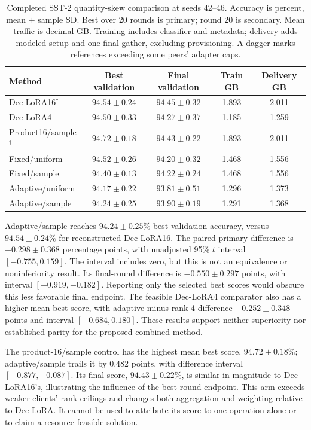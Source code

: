 \documentclass[11pt]{article}
\begin{document}
\begin{table}[t]
\centering
\caption{Completed SST-2 quantity-skew comparison at seeds 42--46. Accuracy is percent, mean $\pm$ sample SD. Best over 20 rounds is primary; round 20 is secondary. Mean traffic is decimal GB. Training includes classifier and metadata; delivery adds modeled setup and one final gather, excluding provisioning. A dagger marks references exceeding some peers' adapter caps.}
\label{tab:quantity-results}
\small
\begin{tabular}{lcccc}
\toprule
Method & Best validation & Final validation & Train GB & Delivery GB\\
\midrule
Dec-LoRA16$^\dagger$ & $94.54\pm0.24$ & $94.45\pm0.32$ & 1.893 & 2.011\\
Dec-LoRA4 & $94.50\pm0.33$ & $94.27\pm0.37$ & 1.185 & 1.259\\
Product16/sample$^\dagger$ & $94.72\pm0.18$ & $94.43\pm0.22$ & 1.893 & 2.011\\
Fixed/uniform & $94.52\pm0.26$ & $94.20\pm0.32$ & 1.468 & 1.556\\
Fixed/sample & $94.40\pm0.13$ & $94.22\pm0.24$ & 1.468 & 1.556\\
Adaptive/uniform & $94.17\pm0.22$ & $93.81\pm0.51$ & 1.296 & 1.373\\
Adaptive/sample & $94.24\pm0.25$ & $93.90\pm0.19$ & 1.291 & 1.368\\
\bottomrule
\end{tabular}
\end{table}

Adaptive/sample reaches $94.24\pm0.25\%$ best validation accuracy, versus $94.54\pm0.24\%$ for reconstructed Dec-LoRA16. The paired primary difference is $-0.298\pm0.368$ percentage points, with unadjusted 95\% $t$ interval $[-0.755,0.159]$. The interval includes zero, but this is not an equivalence or noninferiority result. Its final-round difference is $-0.550\pm0.297$ points, with interval $[-0.919,-0.182]$. Reporting only the selected best scores would obscure this less favorable final endpoint. The feasible Dec-LoRA4 comparator also has a higher mean best score, with adaptive minus rank-4 difference $-0.252\pm0.348$ points and interval $[-0.684,0.180]$. These results support neither superiority nor established parity for the proposed combined method.

The product-16/sample control has the highest mean best score, $94.72\pm0.18\%$; adaptive/sample trails it by $0.482$ points, with difference interval $[-0.877,-0.087]$. Its final score, $94.43\pm0.22\%$, is similar in magnitude to Dec-LoRA16's, illustrating the influence of the best-round endpoint. This arm exceeds weaker clients' rank ceilings and changes both aggregation and weighting relative to Dec-LoRA. It cannot be used to attribute its score to one operation alone or to claim a resource-feasible solution.
\end{document}
